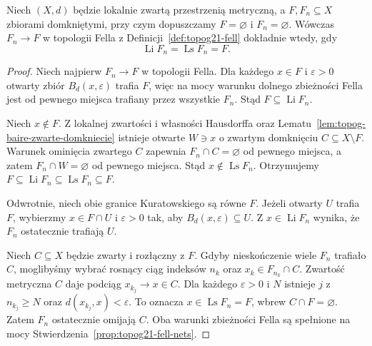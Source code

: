 \begin{twierdzenie}
\label{thm:topog22-fell-kuratowski}
Niech \((X,d)\) będzie lokalnie zwartą
przestrzenią metryczną, a \(F,F_n\subseteq X\)
zbiorami domkniętymi, przy czym dopuszczamy
\(F=\varnothing\) i \(F_n=\varnothing\).
Wówczas \(F_n\to F\) w topologii Fella
z Definicji~\ref{def:topog21-fell}
dokładnie wtedy, gdy
\[
 \operatorname{Li}F_n=\operatorname{Ls}F_n=F.
\]
\end{twierdzenie}
\begin{proof}
Niech najpierw \(F_n\to F\) w topologii Fella.
Dla każdego \(x\in F\) i \(\varepsilon>0\)
otwarty zbiór \(B_d(x,\varepsilon)\) trafia \(F\),
więc na mocy warunku dolnego
zbieżności Fella jest od pewnego miejsca
trafiany przez wszystkie \(F_n\).
Stąd \(F\subseteq\operatorname{Li}F_n\).

Niech \(x\notin F\).
Z lokalnej zwartości i własności Hausdorffa
oraz Lematu~\ref{lem:topog-baire-zwarte-domkniecie}
istnieje otwarte \(W\ni x\)
o zwartym domknięciu \(C\subseteq X\setminus F\).
Warunek ominięcia zwartego \(C\)
zapewnia \(F_n\cap C=\varnothing\)
od pewnego miejsca, a zatem
\(F_n\cap W=\varnothing\) od pewnego miejsca.
Stąd \(x\notin\operatorname{Ls}F_n\).
Otrzymujemy
\(F\subseteq\operatorname{Li}F_n
\subseteq\operatorname{Ls}F_n\subseteq F\).

Odwrotnie, niech obie granice Kuratowskiego
są równe \(F\).
Jeżeli otwarty \(U\) trafia \(F\),
wybierzmy \(x\in F\cap U\) i
\(\varepsilon>0\) tak, aby
\(B_d(x,\varepsilon)\subseteq U\).
Z \(x\in\operatorname{Li}F_n\)
wynika, że \(F_n\) ostatecznie trafiają \(U\).

Niech \(C\subseteq X\) będzie zwarty
i rozłączny z \(F\).
Gdyby nieskończenie wiele \(F_n\) trafiało \(C\),
moglibyśmy wybrać rosnący ciąg indeksów \(n_k\)
oraz \(x_k\in F_{n_k}\cap C\).
Zwartość metryczna \(C\) daje podciąg
\(x_{k_j}\to x\in C\).
Dla każdego \(\varepsilon>0\) i \(N\)
istnieje \(j\) z \(n_{k_j}\ge N\)
oraz \(d(x_{k_j},x)<\varepsilon\).
To oznacza \(x\in\operatorname{Ls}F_n=F\),
wbrew \(C\cap F=\varnothing\).
Zatem \(F_n\) ostatecznie omijają \(C\).
Oba warunki zbieżności Fella są spełnione
na mocy Stwierdzenia~\ref{prop:topog21-fell-nets}.
\end{proof}

